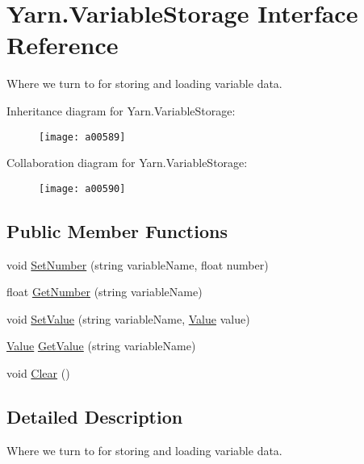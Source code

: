 \hypertarget{a00180}{\section{Yarn.\-Variable\-Storage Interface Reference}
\label{a00180}
}


Where we turn to for storing and loading variable data.  




Inheritance diagram for Yarn.\-Variable\-Storage\-:
\nopagebreak
\begin{figure}[H]
\begin{center}
\leavevmode
\texttt{[image: a00589]}
\end{center}
\end{figure}


Collaboration diagram for Yarn.\-Variable\-Storage\-:
\nopagebreak
\begin{figure}[H]
\begin{center}
\leavevmode
\texttt{[image: a00590]}
\end{center}
\end{figure}
\subsection*{Public Member Functions}
\begin{DoxyCompactItemize}
\item 
void \hyperlink{a00180_aa28c3694f985cf73489efc301b9d41dd}{Set\-Number} (string variable\-Name, float number)
\item 
float \hyperlink{a00180_a04b061c52d8ac814ce559da5286fbc71}{Get\-Number} (string variable\-Name)
\item 
void \hyperlink{a00180_aa90ff61224432c5ed3ce72199c55f440}{Set\-Value} (string variable\-Name, \hyperlink{a00177}{Value} value)
\item 
\hyperlink{a00177}{Value} \hyperlink{a00180_accab1fc5c8fc353dbfc53ca0f4029576}{Get\-Value} (string variable\-Name)
\item 
void \hyperlink{a00180_af98c1e41f351cb96e13f668ca2fd9d92}{Clear} ()
\end{DoxyCompactItemize}


\subsection{Detailed Description}
Where we turn to for storing and loading variable data. 

